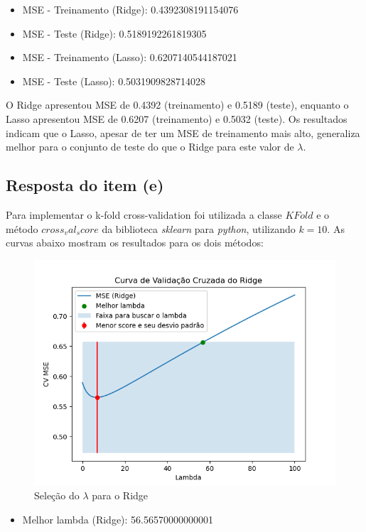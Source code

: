 \begin{itemize}
    \item MSE - Treinamento (Ridge): 0.4392308191154076
    \item MSE - Teste (Ridge): 0.5189192261819305
    \item MSE - Treinamento (Lasso): 0.6207140544187021
    \item MSE - Teste (Lasso): 0.5031909828714028
\end{itemize}

O Ridge apresentou MSE de 0.4392 (treinamento) e 0.5189 (teste), enquanto o Lasso apresentou MSE de 0.6207 (treinamento) e 0.5032 (teste). Os resultados indicam que o Lasso, apesar de ter um MSE de treinamento mais alto, generaliza melhor para o conjunto de teste do que o Ridge para este valor de $\lambda$.

\subsection{Resposta do item (e)}
Para implementar o k-fold cross-validation foi utilizada a classe $KFold$ e o método $cross_val_score$ da biblioteca \textit{sklearn} para \textit{python}, utilizando $k=10$.
As curvas abaixo mostram os resultados para os dois métodos:

\begin{figure}[H]
    \centering
    \caption{Seleção do $\lambda$ para o Ridge}
    \includegraphics[width=12cm]{ridge.png}
\end{figure}

\begin{itemize}
    \item Melhor lambda (Ridge):  56.56570000000001
\end{itemize}

